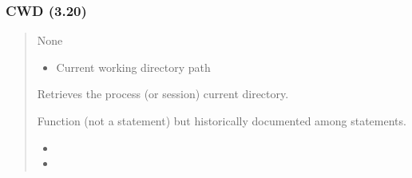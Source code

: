 \documentclass[letterpaper,10pt,english]{sphinxmanual}
\begin{document}
\subsubsection{CWD (3.20)}
\label{\detokenize{ppl:id8}}\begin{quote}

\sphinxAtStartPar
{}
\begin{description}
\sphinxAtStartPar
None

\begin{itemize}
\item {} 
\sphinxAtStartPar
{} \textendash{} Current working directory path

\end{itemize}

\sphinxAtStartPar
Retrieves the process (or session) current directory.

\end{description}

\sphinxAtStartPar
{}
\begin{quote}

\begin{sphinxVerbatim}[commandchars=\\\{\}]
  
\end{sphinxVerbatim}
\end{quote}
\begin{description}
\sphinxAtStartPar
Function (not a statement) but historically documented among statements.

\begin{itemize}
\item {} 
\sphinxAtStartPar
{}

\item {} 
\sphinxAtStartPar
{}

\end{itemize}

\end{description}
\end{quote}
\end{document}
